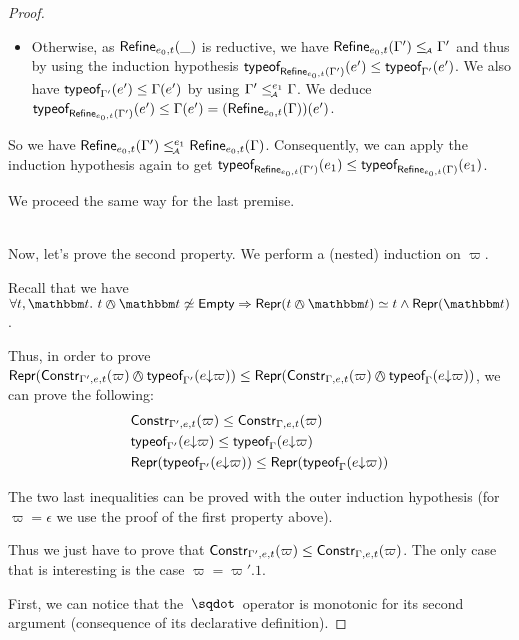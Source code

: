 \documentclass[a4paper]{article}
\theoremstyle{definition}
\begin{document}
\begin{proof}
\begin{description}
\begin{itemize}
      \item Otherwise, as $\Refine {e_0,t} {\_}$ is reductive,
      we have $\Refine {e_0,t} {\Gamma'} \leqA \Gamma'$ and thus by using the induction hypothesis
      $\tyof {e'} {\Refine {e_0,t} {\Gamma'}} \leq \tyof {e'} {\Gamma'}$.
      We also have $\tyof {e'} {\Gamma'} \leq \Gamma(e')$ by using $\Gamma' \leqA^{e_1} \Gamma$.
      We deduce $\tyof {e'} {\Refine {e_0,t} {\Gamma'}} \leq \Gamma(e') = (\Refine {e_0,t} \Gamma) (e')$.
    \end{itemize}
    
    So we have $\Refine {e_0,t} {\Gamma'} \leqA^{e_1} \Refine {e_0,t} \Gamma$.
    Consequently, we can apply the induction hypothesis again to get
    $\tyof {e_1} {\Refine {e_0,t} {\Gamma'}} \leq \tyof {e_1} {\Refine {e_0,t} {\Gamma}}$.

    We proceed the same way for the last premise.
  \end{description}\ \\

  Now, let's prove the second property.
  We perform a (nested) induction on $\varpi$.

  Recall that we have $\forall t,\ts.\ t\tsand\ts \not\simeq \Empty \Rightarrow \tsrep{t\tsand\ts} \simeq t \land \tsrep{\ts}$.
  
  Thus, in order to prove
  $\tsrep {\constr {\varpi} {\Gamma',e,t} \tsand \tyof {\occ e \varpi} {\Gamma'}} \leq \tsrep {\constr {\varpi} {\Gamma,e,t} \tsand \tyof {\occ e \varpi} {\Gamma}}$,
  we can prove the following:
  \begin{align*}
    &\constr {\varpi} {\Gamma',e,t} \leq \constr {\varpi} {\Gamma,e,t}\\
    &\tyof {\occ e \varpi} {\Gamma'} \leq \tyof {\occ e \varpi} {\Gamma}\\
    &\tsrep{\tyof {\occ e \varpi} {\Gamma'}} \leq \tsrep{\tyof {\occ e \varpi} {\Gamma}}
  \end{align*}

  The two last inequalities can be proved
  with the outer induction hypothesis (for $\varpi=\epsilon$ we use the proof of the first property above).

  Thus we just have to prove that $\constr {\varpi} {\Gamma',e,t} \leq \constr {\varpi} {\Gamma,e,t}$.
  The only case that is interesting is the case $\varpi=\varpi'.1$.

  First, we can notice that the $\worra {} {}$ operator is monotonic for its second argument
  (consequence of its declarative definition).


\end{proof}
\end{document}
